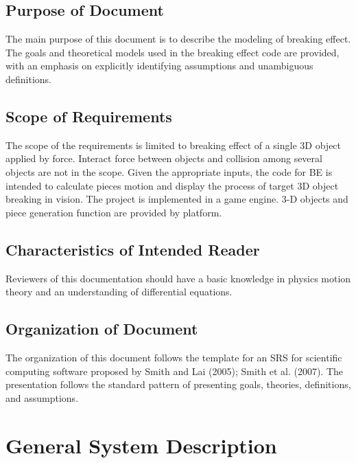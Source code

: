 \documentclass[12pt]{article}
\begin{document}
\subsection{Purpose of Document}

The main purpose of this document is to describe the modeling of breaking effect. The goals and theoretical models used in the breaking effect code are provided, with an emphasis on explicitly identifying assumptions and unambiguous definitions. 

\subsection{Scope of Requirements} 

The scope of the requirements is limited to breaking effect of a single 3D object applied by force. Interact force between objects and collision among several objects are not in the scope. Given the appropriate inputs, the code for BE is intended to calculate pieces motion and display the process of target 3D object breaking in vision. The project is implemented in a game engine. 3-D objects and piece generation function are provided by platform. 

\subsection{Characteristics of Intended Reader} 

Reviewers of this documentation should have a basic knowledge in physics motion
theory and an understanding of differential equations.  

\subsection{Organization of Document}

The organization of this document follows the template for an SRS for scientific
computing software proposed by Smith and Lai (2005); Smith et al. (2007). The
presentation follows the standard pattern of presenting goals, theories,
definitions, and assumptions. 

\section{General System Description}
\end{document}
